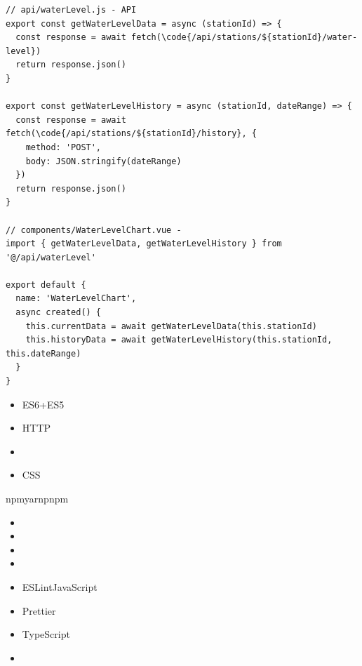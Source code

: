 \begin{lstlisting}[style=javascript]
// api/waterLevel.js - API
export const getWaterLevelData = async (stationId) => {
  const response = await fetch(\code{/api/stations/${stationId}/water-level})
  return response.json()
}

export const getWaterLevelHistory = async (stationId, dateRange) => {
  const response = await fetch(\code{/api/stations/${stationId}/history}, {
    method: 'POST',
    body: JSON.stringify(dateRange)
  })
  return response.json()
}

// components/WaterLevelChart.vue - 
import { getWaterLevelData, getWaterLevelHistory } from '@/api/waterLevel'

export default {
  name: 'WaterLevelChart',
  async created() {
    this.currentData = await getWaterLevelData(this.stationId)
    this.historyData = await getWaterLevelHistory(this.stationId, this.dateRange)
  }
}
\end{lstlisting}


\begin{itemize}
\item
  \important{}ES6+ES5
\item
  \important{}HTTP
\item
  \important{}
\item
  \important{}CSS
\end{itemize}


npmyarnpnpm

\begin{itemize}
\item
  \important{}
\item
  \important{}
\item
  \important{}
\item
  \important{}
\end{itemize}


\begin{itemize}
\item
  \important{}ESLintJavaScript
\item
  \important{}Prettier
\item
  \important{}TypeScript
\item
  \important{}
\end{itemize}

\hypertarget{section-35}{%
\subsubsection{}\label{section-35}}

